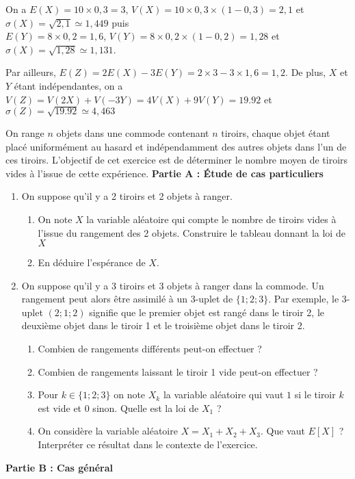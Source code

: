 \documentclass[11pt,fleqn, openany]{book} %
\begin{document}
\begin{solution}On a $E(X)= 10 \times 0,3=3$, $V(X)= 10 \times 0,3 \times (1-0,3)= 2,1$ et $\sigma(X)=\sqrt{2,1}\simeq 1,449$ puis \\ $E(Y)= 8 \times 0,2 = 1,6$, $V(Y)=8 \times 0,2 \times (1-0,2)= 1,28$ et $\sigma(X)=\sqrt{1,28} \simeq 1,131$.

Par ailleurs, $E(Z)=2E(X)-3E(Y)=2 \times 3 - 3 \times 1,6 = 1,2$. De plus, $X$ et $Y$ étant indépendantes, on a $V(Z)=V(2X)+V(-3Y)=4V(X)+9V(Y)=19.92$ et $\sigma(Z)=\sqrt{19.92}\simeq 4,463$
\end{solution}




\begin{exercise}
On range $n$ objets dans une commode contenant $n$ tiroirs, chaque objet étant placé uniformément au hasard et indépendamment des autres objets dans l'un de ces tiroirs. L'objectif de cet exercice est de déterminer le nombre moyen de tiroirs vides à l'issue de cette expérience.
\vskip10pt
\textbf{Partie A : Étude de cas particuliers}

\begin{enumerate}
\item On suppose qu'il y a 2 tiroirs et 2 objets à ranger. 

\begin{enumerate}
\item On note $X$ la variable aléatoire qui compte le nombre de tiroirs vides à l'issue du rangement des 2 objets. Construire le tableau donnant la loi de $X$
\item En déduire l'espérance de $X$. 
\end{enumerate}
\item On suppose qu'il y a 3 tiroirs et 3 objets à ranger dans la commode. Un rangement peut alors être assimilé à un 3-uplet de $\{1;2;3\}$. Par exemple, le 3-uplet $(2;1;2)$ signifie que  le premier objet est rangé dans le tiroir 2, le deuxième objet dans le tiroir 1 et le troisième objet dans le tiroir 2.
\begin{enumerate}
\item Combien de rangements différents peut-on effectuer ?
\item Combien de rangements laissant le tiroir 1 vide peut-on effectuer ?
\item Pour $k \in \{ 1 ; 2 ; 3\}$ on note $X_k$ la variable aléatoire qui vaut $1$ si le tiroir $k$ est vide et 0 sinon. Quelle est la loi de $X_1$ ?
\item On considère la variable aléatoire $X=X_1+X_2+X_3$. Que vaut $E[X]$ ? Interpréter ce résultat dans le contexte de l'exercice.
\end{enumerate}
\end{enumerate}
\newpage
\textbf{Partie B : Cas général}


\end{exercise}
\end{document}
